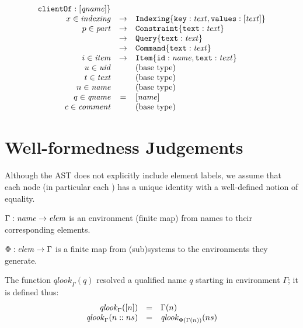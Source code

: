 \documentclass{article}
\begin{document}
\[\begin{array}{rcll}
                                                  \texttt{clientOf}:[{\mathit{qname}}]\} \\
  x \in \mathit{indexing} & \rightarrow & \texttt{Indexing}\{\texttt{key}:\mathit{text},\texttt{values}:[{\mathit{text}}]\} \\
  p \in \mathit{part} & \rightarrow & \texttt{Constraint}\{\texttt{text}:\mathit{text} \} \\
                  & \rightarrow & \texttt{Query}\{\texttt{text}:\mathit{text}\} \\
                  & \rightarrow & \texttt{Command}\{\texttt{text}:\mathit{text}\} \\
  i \in \mathit{item} & \rightarrow & \texttt{Item}\{\texttt{id}:\mathit{name},\texttt{text}:\mathit{text} \} \\
  u \in \mathit{uid} & & \text{(base type)} \\
  t \in \mathit{text}& & \text{(base type)} \\
  n \in \mathit{name}& & \text{(base type)} \\
  q \in \mathit{qname}& = & [{\mathit{name}}] \\
  c \in \mathit{comment}&  & \text{(base type)} \\
\end{array}
\]

\vfill\eject

\section{Well-formedness Judgements}

\newcommand{\senv}{\Phi}
\newcommand{\env}{\Gamma}
\newcommand{\qlookup}[2]{\mathit{qlook}_{#1}({#2})}
\newcommand{\qnames}[1]{\mathit{qnames}({#1})}
\newcommand{\nocycles}[1]{\mathit{nocycles}({#1})}

Although the AST does not explicitly include element labels, we assume that each node (in particular each )
has a unique identity with a well-defined notion of equality.

$\env : \nt{name} \rightarrow \nt{elem}$ is an environment (finite map) from names
to their corresponding elements.

$\senv : \nt{elem} \rightarrow \env$ is a finite map from (sub)systems
to the environments they generate.

The function $\qlookup{\env}{q}$ resolved a qualified name $q$ starting in environment $\env$; it is defined thus:
\[
\begin{array}{rcl}
\qlookup{\env}{\singlelist{n}} &= &\env(n) \\
\qlookup{\env}{\conslist{n}{ns}} & =& \qlookup{\senv(\env(n))}{ns}
\end{array}
\]
\end{document}
